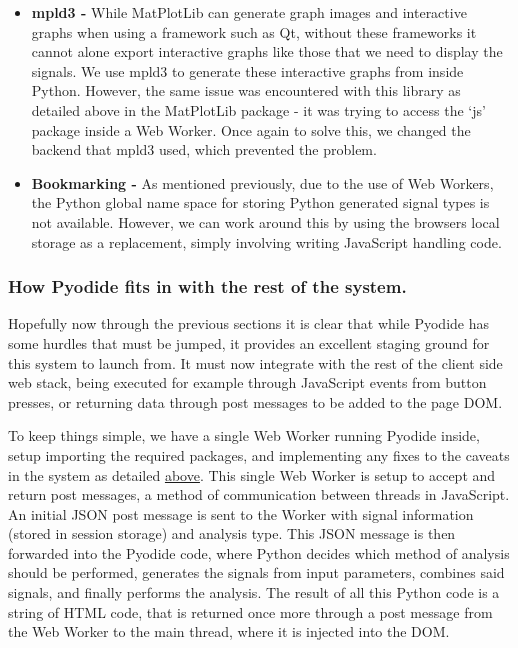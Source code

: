 \begin{itemize}
    \item {\bf mpld3 - } While MatPlotLib can generate graph images and interactive graphs when using a framework such as Qt, without these frameworks it cannot alone export interactive graphs
    like those that we need to display the signals. We use mpld3 to generate these interactive graphs from inside Python. However, the same issue was encountered with this library as detailed above in the
    MatPlotLib package - it was trying to access the `js' package inside a Web Worker. Once again to solve this, we changed the backend that mpld3 used, which prevented the problem.

    \item {\bf Bookmarking - } As mentioned previously, due to the use of Web Workers, the Python global name space for storing Python generated signal types is not available. However, 
    we can work around this by using the browsers local storage as a replacement, simply involving writing JavaScript handling code.
\end{itemize}


\subsubsection{How Pyodide fits in with the rest of the system.}

Hopefully now through the previous sections it is clear that while Pyodide has some hurdles that must be jumped, it provides an excellent staging ground for this system to launch from.
It must now integrate with the rest of the client side web stack, being executed for example through JavaScript events from button presses, or returning data through post messages to be added
to the page DOM.

To keep things simple, we have a single Web Worker running Pyodide inside, setup importing the required packages, and implementing any fixes to the caveats in the system as detailed \hyperref[howweusepyodide]{above}.
This single Web Worker is setup to accept and return post messages, a method of communication between threads in JavaScript. An initial JSON post message is sent to the Worker with signal information (stored
in session storage) and analysis type. This JSON message is then forwarded into the Pyodide code, where Python decides which method of analysis should be performed, generates the signals from input parameters,
combines said signals, and finally performs the analysis. The result of all this Python code is a string of HTML code, that is returned once more through a post message from the Web Worker to the main thread,
where it is injected into the DOM.

